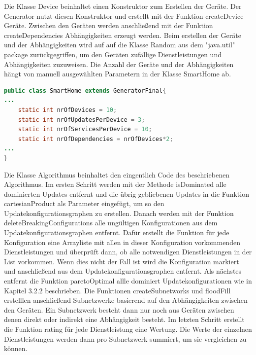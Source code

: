 Die Klasse Device beinhaltet einen Konstruktor zum Erstellen der Geräte. Der Generator nutzt diesen Konstruktor und erstellt mit der
Funktion createDevice Geräte. Zwischen den Geräten werden anschließend mit der Funktion createDependencies Abhängigkeiten erzeugt werden.
Beim erstellen der Geräte und der Abhängigkeiten wird auf auf die Klasse Random aus dem "java.util" package zurückgegriffen, um den Geräten
zufällige Dienstleistungen und Abhängigkeiten zuzuweisen. Die Anzahl der Geräte und der Abhängigkeiten hängt von manuell ausgewählten
Parametern in der Klasse SmartHome ab.
\begin{lstlisting}[language=Java]
public class SmartHome extends GeneratorFinal{
... 
    static int nrOfDevices = 10;
    static int nrOfUpdatesPerDevice = 3;
    static int nrOfServicesPerDevice = 10;
    static int nrOfDependencies = nrOfDevices*2;
...
}
\end{lstlisting}
Die Klasse Algorithmus beinhaltet den eingentlich Code des beschriebenen Algorithmus.
Im ersten Schritt werden mit der Methode isDominated alle dominierten Updates entfernt und die übrig gebliebenen Updates in die Funktion
cartesianProduct als Parameter eingefügt, um so den Updatekonfigurationsgraphen zu erstellen.
Danach werden mit der Funktion deleteBreakingConfigurations alle ungültigen Konfigurationen aus dem Updatekonfigurationsgraphen entfernt.
Dafür erstellt die Funktion für jede Konfiguration eine Arrayliste mit allen in dieser Konfiguration vorkommenden Dienstleistungen und überprüft
dann, ob alle notwendigen Dienstleistungen in der List vorkommen. Wenn dies nicht der Fall ist wird die Konfiguration markiert und anschließend
aus dem Updatekonfigurationsgraphen entfernt. Als nächstes entfernt die Funktion paretoOptimal allle dominiert Updatekonfigurationen wie in
Kapitel 3.2.2 beschrieben. Die Funktionen createSubnetworks und floodFill erstelllen anschließend Subnetzwerke basierend auf den Abhängigkeiten
zwischen den Geräten. Ein Subnetzwerk besteht dann nur noch aus Geräten zwischen denen direkt oder indirekt eine Abhängigkeit besteht.
Im letzten Schritt erstellt die Funktion rating für jede Dienstleistung eine Wertung. Die Werte der einzelnen Dienstleistungen werden dann pro
Subnetzwerk summiert, um sie vergleichen zu können.



































